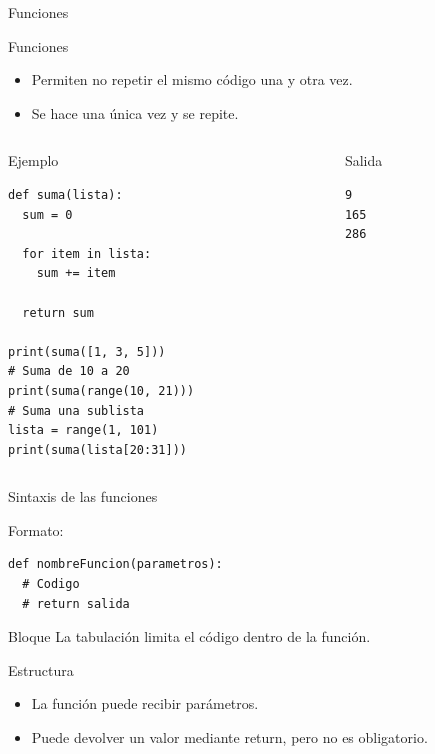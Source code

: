\documentclass[bigger,unknownkeysallowed]{beamer}
\begin{document}
\begin{frame}[fragile,label={sec:org96ac929}]{Funciones}
 \begin{block}{Funciones}
\begin{itemize}
\item Permiten no repetir el mismo código una y otra vez.

\item Se hace una única vez y se repite.
\end{itemize}
\end{block}

\begin{columns}
\begin{column}{0.5\columnwidth}
\begin{exampleblock}{Ejemplo}
\begin{verbatim}
def suma(lista):
  sum = 0

  for item in lista:
    sum += item

  return sum

print(suma([1, 3, 5]))
# Suma de 10 a 20
print(suma(range(10, 21)))
# Suma una sublista
lista = range(1, 101)
print(suma(lista[20:31]))
\end{verbatim}
\end{exampleblock}
\end{column}

\begin{column}{0.5\columnwidth}
\begin{block}{Salida}
\scriptsize
\begin{verbatim}
9
165
286
\end{verbatim}
\end{block}
\end{column}
\end{columns}
\end{frame}

\begin{frame}[fragile,label={sec:orgc8c690e}]{Sintaxis de las funciones}
 \begin{block}{Formato:}
\begin{verbatim}
def nombreFuncion(parametros):
  # Codigo
  # return salida
\end{verbatim}
\end{block}

\begin{block}{Bloque}
La tabulación limita el código dentro de la función.
\end{block}

\begin{block}{Estructura}
\begin{itemize}
\item La función puede recibir parámetros.

\item Puede devolver un valor mediante return, pero no es obligatorio.
\end{itemize}
\end{block}
\end{frame}
\end{document}
